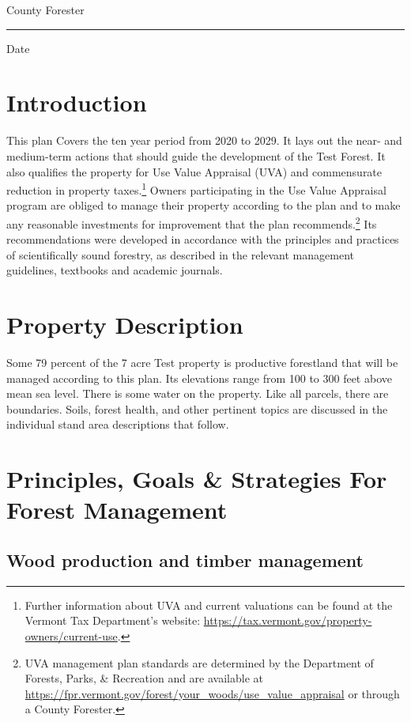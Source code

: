 \documentclass[]{tufte-handout}
\begin{document}
\noindent County Forester \rule{7cm}{0pt} Date

\pagebreak

\section{Introduction}\label{introduction}

This plan Covers the ten year period from 2020 to 2029. It lays out the
near- and medium-term actions that should guide the development of the
Test Forest. It also qualifies the property for Use Value Appraisal
(UVA) and commensurate reduction in property taxes.\footnote{Further
  information about UVA and current valuations can be found at the
  Vermont Tax Department's website:
  \url{https://tax.vermont.gov/property-owners/current-use}.
  \vspace{20pt}} Owners participating in the Use Value Appraisal program
are obliged to manage their property according to the plan and to make
any reasonable investments for improvement that the plan
recommends.\footnote{UVA management plan standards are determined by the
  Department of Forests, Parks, \& Recreation and are available at
  \url{https://fpr.vermont.gov/forest/your_woods/use_value_appraisal} or
  through a County Forester.} Its recommendations were developed in
accordance with the principles and practices of scientifically sound
forestry, as described in the relevant management guidelines, textbooks
and academic journals.

\section{Property Description}\label{property-description}

Some 79 percent of the 7 acre Test property is productive forestland
that will be managed according to this plan. Its elevations range from
100 to 300 feet above mean sea level. There is some water on the
property. Like all parcels, there are boundaries. Soils, forest health,
and other pertinent topics are discussed in the individual stand area
descriptions that follow.

\section{Principles, Goals \& Strategies For Forest
Management}\label{principles-goals-strategies-for-forest-management}

\subsection{Wood production and timber
management}\label{wood-production-and-timber-management}
\end{document}
